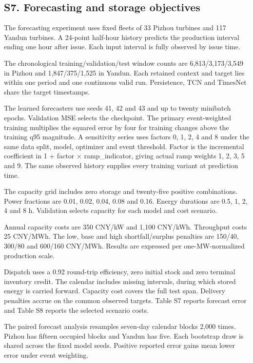 \documentclass[a4paper,11pt]{article}
\begin{document}
\subsection{S7. Forecasting and storage objectives}\label{s7.-forecasting-and-storage-objectives}

The forecasting experiment uses fixed fleets of 33 Pizhou turbines and 117 Yandun turbines. A 24-point half-hour history predicts the production interval ending one hour after issue. Each input interval is fully observed by issue time.

The chronological training/validation/test window counts are 6,813/3,173/3,549 in Pizhou and 1,847/375/1,525 in Yandun. Each retained context and target lies within one period and one continuous valid run. Persistence, TCN and TimesNet share the target timestamps.

The learned forecasters use seeds 41, 42 and 43 and up to twenty minibatch epochs. Validation MSE selects the checkpoint. The primary event-weighted training multiplies the squared error by four for training changes above the training q95 magnitude. A sensitivity series uses factors 0, 1, 2, 4 and 8 under the same data split, model, optimizer and event threshold. Factor is the incremental coefficient in 1 + factor × ramp\_indicator, giving actual ramp weights 1, 2, 3, 5 and 9. The same observed history supplies every training variant at prediction time.

The capacity grid includes zero storage and twenty-five positive combinations. Power fractions are 0.01, 0.02, 0.04, 0.08 and 0.16. Energy durations are 0.5, 1, 2, 4 and 8 h. Validation selects capacity for each model and cost scenario.

Annual capacity costs are 350 CNY/kW and 1,100 CNY/kWh. Throughput costs 25 CNY/MWh. The low, base and high shortfall/surplus penalties are 150/40, 300/80 and 600/160 CNY/MWh. Results are expressed per one-MW-normalized production scale.

Dispatch uses a 0.92 round-trip efficiency, zero initial stock and zero terminal inventory credit. The calendar includes missing intervals, during which stored energy is carried forward. Capacity cost covers the full test span. Delivery penalties accrue on the common observed targets. Table S7 reports forecast error and Table S8 reports the selected scenario costs.

The paired forecast analysis resamples seven-day calendar blocks 2,000 times. Pizhou has fifteen occupied blocks and Yandun has five. Each bootstrap draw is shared across the fixed model seeds. Positive reported error gains mean lower error under event weighting.
\end{document}
